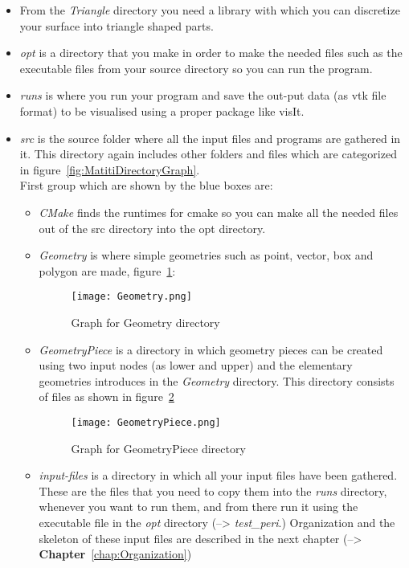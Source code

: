 \documentclass[11pt,fleqn]{book} %
\begin{document}
\begin{itemize}
\item From the \emph{Triangle} directory you need a library with which you can discretize your surface into triangle shaped parts.    
\item \emph{opt} is a directory that you make in order to make the needed files such as the executable files from your source directory so you can run the program. 
\item \emph{runs} is where you run your program and save the out-put data (as vtk file format) to be visualised using a proper package like visIt. 
\item \emph{src} is the source folder where all the input files and programs are gathered in it. This directory again includes other folders and files which are categorized in figure~\ref{fig:MatitiDirectoryGraph}. \\
First group which are shown by the blue boxes are:
 \begin{itemize}
 \item \emph{CMake} finds the runtimes for cmake so you can make all the needed files out of the src directory into the opt directory.
 \item \emph{Geometry} is where simple geometries such as point, vector, box and polygon are made, figure~\ref{fig:Geometry}:
\begin{figure}
  \texttt{[image: Geometry.png]}
  \caption{Graph for Geometry directory}
  \label{fig:Geometry}
\end{figure}
 \item \emph{GeometryPiece} is a directory in which geometry pieces can be created using two input nodes (as lower and upper) and the elementary geometries introduces in the \emph{Geometry} directory. This directory consists of files as shown in figure~\ref{fig:GeometryPiece}
\begin{figure}
  \texttt{[image: GeometryPiece.png]}
  \caption{Graph for GeometryPiece directory}
  \label{fig:GeometryPiece}
\end{figure}
 \item \emph{input-files} is a directory in which all your input files have been gathered. These are the files that you need to copy them into the \emph{runs} directory, whenever you want to run them, and from there run it using the executable file in the \emph{opt} directory (--> \emph{test\_peri}.) Organization and the skeleton of these input files are described in the next chapter (--> \textbf{Chapter}~\ref{chap:Organization})
 \end{itemize}

\end{itemize}
\end{document}
